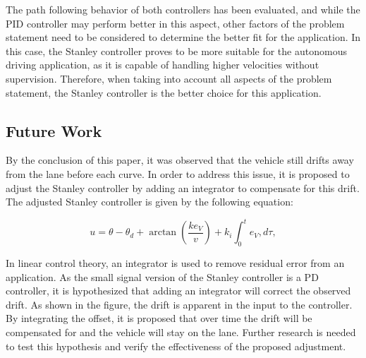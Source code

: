 \documentclass[arbeit=studie,oneside,BCOR=12mm]{ArbeitRST}
\begin{document}
The path following behavior of both controllers has been evaluated, and while
the PID controller may perform better in this aspect, other factors of the
problem statement need to be considered to determine the better fit for the
application. In this case, the Stanley controller proves to be more suitable
for the autonomous driving application, as it is capable of handling higher
velocities without supervision. Therefore, when taking into account all aspects
of the problem statement, the Stanley controller is the better choice for this
application.

\subsection{Future Work}

By the conclusion of this paper, it was observed that the vehicle still drifts
away from the lane before each curve. In order to address this issue, it is
proposed to adjust the Stanley controller by adding an integrator to compensate
for this drift. The adjusted Stanley controller is given by the following
equation:

\begin{equation}
u = \theta - \theta_d + \arctan\left(\frac{ke_{V}}{v}\right) + k_{i} \int_{0}^{t} e_{V},d\tau,
\label{eq:Stanley-Regler-adjusted}
\end{equation}

In linear control theory, an integrator is used to remove residual error from
an application. As the small signal version of the Stanley controller is a PD
controller, it is hypothesized that adding an integrator will correct the
observed drift. As shown in the figure, the drift is apparent in the input to
the controller. By integrating the offset, it is proposed that over time the
drift will be compensated for and the vehicle will stay on the lane. Further
research is needed to test this hypothesis and verify the effectiveness of the
proposed adjustment.

\iffalse
By the conclusion of this paper, the vehicle still drifts away from the
lane before each curve. In the future, it is proposed to adjust the Stanley
controller to include an integrator in order to compensate for this drift.
The adjusted Stanley controller has the form of the following equation:

\begin{equation} 
    u = \theta - \theta_d + \arctan\left(\frac{ke_{fa}}{v}\right) + k_{i} \int_{0}^{\infty} e_{fa}\,dt, 
    \label{eq:Stanley-Regler-adjusted} 
\end{equation}

In linear control theory, an integrator is used in order to remove residual
error from an application. As the small signal version of the Stanley
controller is a PD controller, it is hypothesized that an integrator will 
correct this observed drift. As can be seen in FIGURE, the drift is apparent in
the input to the controller. By integrating the offset it is proposed that
over time the drift will be componsated for and the vehicle stay on the lane. 
\fi
\end{document}
